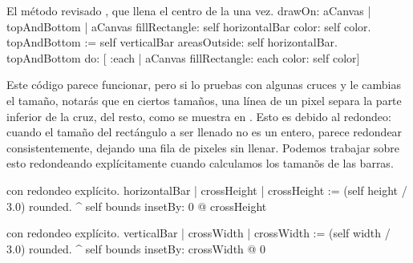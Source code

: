 \documentclass[a4paper,10pt,twoside]{book}
\begin{document}
\begin{method}{El m\'etodo revisado , que llena el centro de la una vez.}
drawOn: aCanvas 
	| topAndBottom |
	aCanvas fillRectangle: self horizontalBar color: self color.
	topAndBottom := self verticalBar areasOutside: self horizontalBar. 
	topAndBottom do: [ :each | aCanvas fillRectangle: each color: self color]
\end{method}

Este c\'odigo parece funcionar, pero si lo pruebas con algunas cruces y le cambias el tama\~no, notar\'as que en ciertos tama\~nos, una l\'inea de un pixel separa la parte inferior de la cruz, del resto, como se muestra en .
Esto es debido al redondeo: cuando el tama\~no del rect\'angulo a ser llenado no es un entero,  parece redondear consistentemente, dejando una fila de pixeles sin llenar.
Podemos trabajar sobre esto redondeando expl\'icitamente cuando calculamos los taman\~os de las barras.

\begin{method}{ con redondeo expl\'icito.}
horizontalBar
	| crossHeight |
	crossHeight := (self height / 3.0) rounded.
	^ self bounds insetBy: 0 @ crossHeight
\end{method}

\begin{method}{ con redondeo expl\'icito.}
verticalBar
	| crossWidth |
	crossWidth := (self width / 3.0) rounded.
	^ self bounds insetBy: crossWidth @ 0
\end{method}






\end{document}
